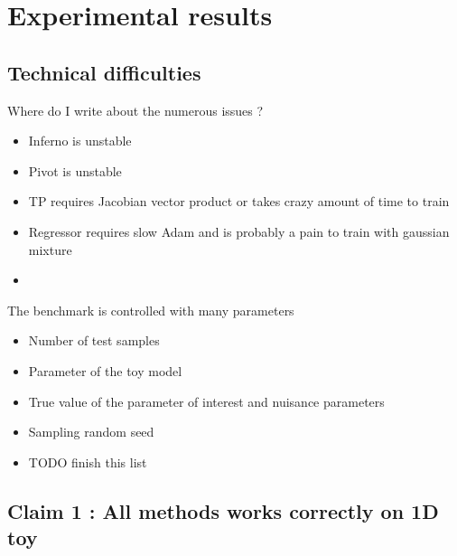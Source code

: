 
\chapter{Experimental results}
\label{chap:xp}
\ifpdf
    \graphicspath{{Chapter5/Figs/Raster/}{Chapter5/Figs/PDF/}{Chapter5/Figs/}}
\else
    \graphicspath{{Chapter5/Figs/Vector/}{Chapter5/Figs/}}
\fi




\section{Technical difficulties} %
\label{sec:technical_difficulties}

Where do I write about the numerous issues ?
\begin{itemize}
  \item Inferno is unstable
  \item Pivot is unstable
  \item TP requires Jacobian vector product or takes crazy amount of time to train
  \item Regressor requires slow Adam and is probably a pain to train with gaussian mixture
  \item
\end{itemize}



The benchmark is controlled with many parameters
\begin{itemize}
  \item Number of test samples
  \item Parameter of the toy model
  \item True value of the parameter of interest and nuisance parameters
  \item Sampling random seed
  \item TODO finish this list
\end{itemize}










\section{Claim 1 : All methods works correctly on 1D toy}
\label{sec:claim_1D_toy}

